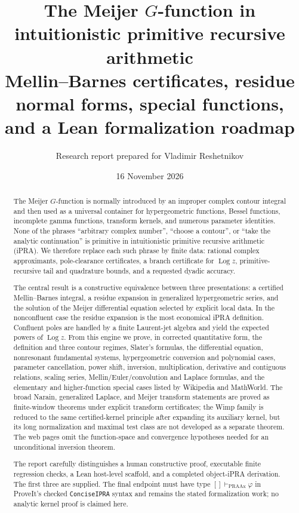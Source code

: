 \documentclass[11pt]{article}
\title{\textbf{The Meijer $G$-function in intuitionistic primitive recursive arithmetic}\\
\large Mellin--Barnes certificates, residue normal forms, special functions, and a Lean formalization roadmap}
\author{Research report prepared for Vladimir Reshetnikov}
\date{16 November 2026}
\newcommand{\Log}{\operatorname{Log}}
\newcommand{\code}[1]{\texttt{#1}}
\begin{document}
\maketitle

\begin{abstract}
The Meijer $G$-function is normally introduced by an improper complex contour
integral and then used as a universal container for hypergeometric functions,
Bessel functions, incomplete gamma functions, transform kernels, and numerous
parameter identities.  None of the phrases ``arbitrary complex number'',
``choose a contour'', or ``take the analytic continuation'' is primitive in
intuitionistic primitive recursive arithmetic (iPRA).  We therefore replace
each such phrase by finite data: rational complex approximants, pole-clearance
certificates, a branch certificate for $\Log z$, primitive-recursive tail and
quadrature bounds, and a requested dyadic accuracy.

The central result is a constructive equivalence between three presentations:
a certified Mellin--Barnes integral, a residue expansion in generalized
hypergeometric series, and the solution of the Meijer differential equation
selected by explicit local data.  In the nonconfluent case the residue
expansion is the most economical iPRA definition.  Confluent poles are handled
by a finite Laurent-jet algebra and yield the expected powers of $\Log z$.
From this engine we prove, in corrected quantitative form, the definition and
three contour regimes, Slater's formulas, the differential equation,
nonresonant fundamental systems, hypergeometric conversion and polynomial
cases, parameter cancellation, power shift, inversion, multiplication,
derivative and contiguous relations, scaling series, Mellin/Euler/convolution
and Laplace formulas, and the elementary and higher-function special cases
listed by Wikipedia and MathWorld.  The broad Narain, generalized Laplace, and Meijer transform statements are
proved as finite-window theorems under explicit transform certificates; the
Wimp family is reduced to the same certified-kernel principle after expanding
its auxiliary kernel, but its long normalization and maximal test class are not
developed as a separate theorem.  The web pages omit the function-space and
convergence hypotheses needed for an unconditional inversion theorem.

The report carefully distinguishes a human constructive proof, executable
finite regression checks, a Lean host-level scaffold, and a completed
object-iPRA derivation.  The first three are supplied.  The final endpoint must
have type $[]\vdash_{\mathrm{PRAAx}}\varphi$ in ProveIt's checked
\code{ConciseIPRA} syntax and remains the stated formalization work; no analytic
kernel proof is claimed here.
\end{abstract}
\end{document}
